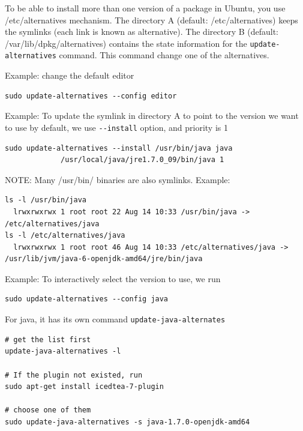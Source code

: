 To be able to install more than one version of a package in Ubuntu, you use
/etc/alternatives mechanism. The directory A (default: /etc/alternatives) keeps
the symlinks (each link is known as alternative). The directory B (default:
/var/lib/dpkg/alternatives) contains the state information for the
\verb!update-alternatives! command. This command change one of the alternatives.

Example: change the default editor
\begin{verbatim}
sudo update-alternatives --config editor
\end{verbatim}

Example: To update the symlink in directory A to point to the version we want to
use by default, we use \verb!--install! option, and priority is 1
{\small 
\begin{verbatim}
sudo update-alternatives --install /usr/bin/java java
             /usr/local/java/jre1.7.0_09/bin/java 1
\end{verbatim}}
NOTE: Many /usr/bin/ binaries are also symlinks. Example:
\begin{verbatim}
ls -l /usr/bin/java
  lrwxrwxrwx 1 root root 22 Aug 14 10:33 /usr/bin/java -> /etc/alternatives/java
ls -l /etc/alternatives/java
  lrwxrwxrwx 1 root root 46 Aug 14 10:33 /etc/alternatives/java -> /usr/lib/jvm/java-6-openjdk-amd64/jre/bin/java
\end{verbatim}

Example: To interactively select the version to use, we run
\begin{verbatim}
sudo update-alternatives --config java
\end{verbatim}

For java, it has its own command \verb!update-java-alternates!
\begin{verbatim}
# get the list first
update-java-alternatives -l

# If the plugin not existed, run
sudo apt-get install icedtea-7-plugin

# choose one of them
sudo update-java-alternatives -s java-1.7.0-openjdk-amd64
\end{verbatim}

